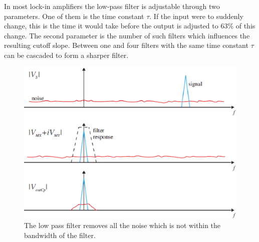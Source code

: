 In most lock-in amplifiers the low-pass filter is adjustable through two parameters. One of them is the time constant $\tau$. If the input were to suddenly change, this is the time it would take before the output is adjusted to 63\% of this change. The second parameter is the number of such filters which influences the resulting cutoff slope. Between one and four filters with the same time constant $\tau$ can be cascaded to form a sharper filter.

\begin{figure}[!hbt]\centering
\includegraphics[width=\linewidth, draft=\foto]{eps/lockin3.eps}
\caption{The low pass filter removes all the noise which is not within the bandwidth of the filter.}
\label{lockin3}
\end{figure}
